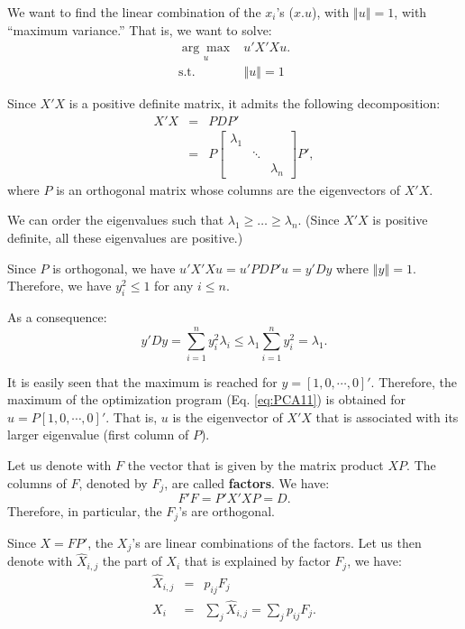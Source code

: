 \documentclass[
  11pt,
]{book}
\theoremstyle{definition}
\theoremstyle{definition}
\theoremstyle{definition}
\theoremstyle{definition}
\theoremstyle{remark}
\begin{document}
We want to find the linear combination of the \(x_{i}\)'s (\(x.u\)), with \(\left\Vert u\right\Vert =1\), with ``maximum variance.'' That is, we want to solve:
\begin{equation}
\begin{array}{clll}
\underset{u}{\arg\max} & u'X'Xu. \\
\mbox{s.t. } & \left\Vert u \right\Vert =1
\end{array}\label{eq:PCA11}
\end{equation}

Since \(X'X\) is a positive definite matrix, it admits the following decomposition:
\begin{eqnarray*}
X'X & = & PDP'\\
& = & P\left[\begin{array}{ccc}
\lambda_{1}\\
& \ddots\\
&  & \lambda_{n}
\end{array}\right]P',
\end{eqnarray*}
where \(P\) is an orthogonal matrix whose columns are the eigenvectors of \(X'X\).

We can order the eigenvalues such that \(\lambda_{1}\geq\ldots\geq\lambda_{n}\). (Since \(X'X\) is positive definite, all these eigenvalues are positive.)

Since \(P\) is orthogonal, we have \(u'X'Xu=u'PDP'u=y'Dy\) where \(\left\Vert y\right\Vert =1\). Therefore, we have \(y_{i}^{2}\leq 1\) for any \(i\leq n\).

As a consequence:
\[
y'Dy=\sum_{i=1}^{n}y_{i}^{2}\lambda_{i}\leq\lambda_{1}\sum_{i=1}^{n}y_{i}^{2}=\lambda_{1}.
\]

It is easily seen that the maximum is reached for \(y=\left[1,0,\cdots,0\right]'\). Therefore, the maximum of the optimization program (Eq. \eqref{eq:PCA11}) is obtained for \(u=P\left[1,0,\cdots,0\right]'\). That is, \(u\) is the eigenvector of \(X'X\) that is associated with its larger eigenvalue (first column of \(P\)).

Let us denote with \(F\) the vector that is given by the matrix product \(XP\). The columns of \(F\), denoted by \(F_{j}\), are called \textbf{factors}. We have:
\[
F'F=P'X'XP=D.
\]
Therefore, in particular, the \(F_{j}\)'s are orthogonal.

Since \(X=FP'\), the \(X_{j}\)'s are linear combinations of the factors. Let us then denote with \(\hat{X}_{i,j}\) the part of \(X_{i}\) that is explained by factor \(F_{j}\), we have:
\begin{eqnarray*}
\hat{X}_{i,j} & = & p_{ij}F_{j}\\
X_{i} & = & \sum_{j}\hat{X}_{i,j}=\sum_{j}p_{ij}F_{j}.
\end{eqnarray*}
\end{document}
